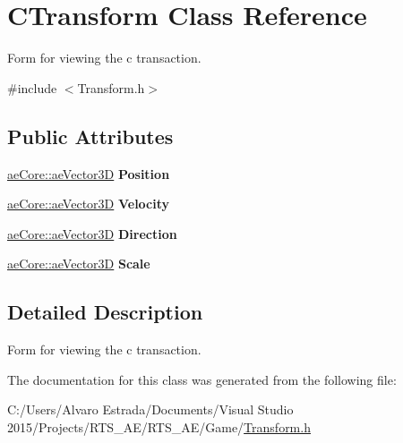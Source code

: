 \hypertarget{class_c_transform}{}\section{C\+Transform Class Reference}
\label{class_c_transform}


Form for viewing the c transaction.  




{\ttfamily \#include $<$Transform.\+h$>$}

\subsection*{Public Attributes}
\begin{DoxyCompactItemize}
\item 
\hyperlink{structae_core_1_1ae_vector3_d}{ae\+Core\+::ae\+Vector3D} {\bfseries Position}\hypertarget{class_c_transform_aab4cba61a6e91a67daacdbcc2ef46b21}{}\label{class_c_transform_aab4cba61a6e91a67daacdbcc2ef46b21}

\item 
\hyperlink{structae_core_1_1ae_vector3_d}{ae\+Core\+::ae\+Vector3D} {\bfseries Velocity}\hypertarget{class_c_transform_aaf50d14d12a3e91bbb70716c53b5f733}{}\label{class_c_transform_aaf50d14d12a3e91bbb70716c53b5f733}

\item 
\hyperlink{structae_core_1_1ae_vector3_d}{ae\+Core\+::ae\+Vector3D} {\bfseries Direction}\hypertarget{class_c_transform_aa9dc72bfb55cb70f0f6d29898a7df3b2}{}\label{class_c_transform_aa9dc72bfb55cb70f0f6d29898a7df3b2}

\item 
\hyperlink{structae_core_1_1ae_vector3_d}{ae\+Core\+::ae\+Vector3D} {\bfseries Scale}\hypertarget{class_c_transform_ac1281df6229405d2064a70e9352a366e}{}\label{class_c_transform_ac1281df6229405d2064a70e9352a366e}

\end{DoxyCompactItemize}


\subsection{Detailed Description}
Form for viewing the c transaction. 

The documentation for this class was generated from the following file\+:\begin{DoxyCompactItemize}
\item 
C\+:/\+Users/\+Alvaro Estrada/\+Documents/\+Visual Studio 2015/\+Projects/\+R\+T\+S\+\_\+\+A\+E/\+R\+T\+S\+\_\+\+A\+E/\+Game/\hyperlink{_transform_8h}{Transform.\+h}\end{DoxyCompactItemize}
